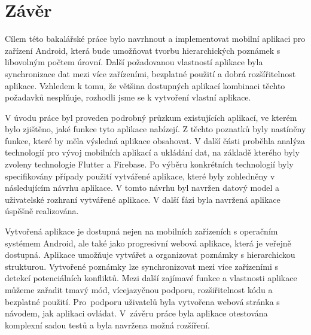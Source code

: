\documentclass[czech, bc, kiv, he, iso690numb]{fasthesis}
\begin{document}
%
%
%
%
\chapter{Závěr}

Cílem této bakalářské práce bylo navrhnout a implementovat mobilní aplikaci pro zařízení Android, která bude umožňovat tvorbu hierarchických poznámek s libovolným počtem úrovní. Další požadovanou vlastností aplikace byla synchronizace dat mezi více zařízeními, bezplatné použití a dobrá rozšířitelnost aplikace. Vzhledem k tomu, že většina dostupných aplikací kombinaci těchto požadavků nesplňuje, rozhodli jsme se k vytvoření vlastní aplikace.

V úvodu práce byl proveden podrobný průzkum existujících aplikací, ve kterém bylo zjištěno, jaké funkce tyto aplikace nabízejí. Z těchto poznatků byly nastíněny funkce, které by měla výsledná aplikace obsahovat. V další části proběhla analýza technologií pro vývoj mobilních aplikací a ukládání dat, na základě kterého byly zvoleny technologie Flutter a Firebase. Po výběru konkrétních technologií byly specifikovány případy použití vytvářené aplikace, které byly zohledněny v následujícím návrhu aplikace. V tomto návrhu byl navržen datový model a uživatelské rozhraní vytvářené aplikace. V další fázi byla navržená aplikace úspěšně realizována.

Vytvořená aplikace je dostupná nejen na mobilních zařízeních s operačním systémem Android, ale také jako progresivní webová aplikace, která je veřejně dostupná. Aplikace umožňuje vytvářet a organizovat poznámky s hierarchickou strukturou. Vytvořené poznámky lze synchronizovat mezi více zařízeními s detekcí potenciálních konfliktů. Mezi další zajímavé funkce a vlastnosti aplikace můžeme zařadit tmavý mód, vícejazyčnou podporu, rozšiřitelnost kódu a bezplatné použití. Pro~podporu uživatelů byla vytvořena webová stránka s návodem, jak aplikaci ovládat. V~závěru práce byla aplikace otestována komplexní sadou testů a byla navržena možná rozšíření.


%
%
%
%
\glsaddall
\printglossaries
\printbibliography
\listoffigures
\listoftables
\listoflistings
\end{document}
